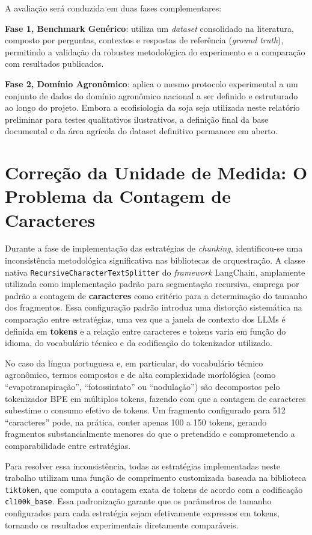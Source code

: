 \documentclass[
	12pt,				%
	openright,			%
	oneside,			%
	a4paper,			%
	tccpreliminar,		%
	]{ABNT-DC-UEL}
\begin{document}
A avaliação será conduzida em duas fases complementares:

\textbf{Fase 1, Benchmark Genérico}: utiliza um \textit{dataset} consolidado na literatura, composto por perguntas, contextos e respostas de referência (\textit{ground truth}), permitindo a validação da robustez metodológica do experimento e a comparação com resultados publicados.

\textbf{Fase 2, Domínio Agronômico}: aplica o mesmo protocolo experimental a um conjunto de dados do domínio agronômico nacional a ser definido e estruturado ao longo do projeto. Embora a ecofisiologia da soja seja utilizada neste relatório preliminar para testes qualitativos ilustrativos, a definição final da base documental e da área agrícola do dataset definitivo permanece em aberto.

\section{Correção da Unidade de Medida: O Problema da Contagem de Caracteres}

Durante a fase de implementação das estratégias de \textit{chunking}, identificou-se uma inconsistência metodológica significativa nas bibliotecas de orquestração. A classe nativa \texttt{RecursiveCharacterTextSplitter} do \textit{framework} LangChain, amplamente utilizada como implementação padrão para segmentação recursiva, emprega por padrão a contagem de \textbf{caracteres} como critério para a determinação do tamanho dos fragmentos. Essa configuração padrão introduz uma distorção sistemática na comparação entre estratégias, uma vez que a janela de contexto dos LLMs é definida em \textbf{tokens} e a relação entre caracteres e tokens varia em função do idioma, do vocabulário técnico e da codificação do tokenizador utilizado.

No caso da língua portuguesa e, em particular, do vocabulário técnico agronômico, termos compostos e de alta complexidade morfológica (como ``evapotranspiração'', ``fotossintato'' ou ``nodulação'') são decompostos pelo tokenizador BPE em múltiplos tokens, fazendo com que a contagem de caracteres subestime o consumo efetivo de tokens. Um fragmento configurado para 512 ``caracteres'' pode, na prática, conter apenas 100 a 150 tokens, gerando fragmentos substancialmente menores do que o pretendido e comprometendo a comparabilidade entre estratégias.

Para resolver essa inconsistência, todas as estratégias implementadas neste trabalho utilizam uma função de comprimento customizada baseada na biblioteca \texttt{tiktoken}, que computa a contagem exata de tokens de acordo com a codificação \texttt{cl100k\_base}. Essa padronização garante que os parâmetros de tamanho configurados para cada estratégia sejam efetivamente expressos em tokens, tornando os resultados experimentais diretamente comparáveis.
\end{document}
